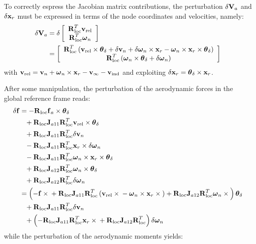 To correctly espress the Jacobian matrix contributions, the perturbation 
$\delta\T{V}_a$ and $\delta \T{x}_r$ must be expressed in terms of 
the node coordinates and velocities, namely:
\begin{align}
	\delta\T{V}_a &= \delta\sqbr{\matr{c}{
		\TT{R}^T_{\text{loc}}
			\T{v}_{\text{rel}}
		\\
		\TT{R}^T_{\text{loc}} \T{\omega}_n
		}}
	\nonumber \\
	&= \sqbr{\matr{c}{
	\TT{R}^T_{\text{loc}} \plbr{
		\T{v}_{\text{rel}} \times \T{\theta}_\delta
		+ \delta\T{v}_n
		+ \delta\T{\omega}_n\times\T{x}_r
		- \T{\omega}_n\times\T{x}_r\times\T{\theta}_{\delta}}
	\\
	\TT{R}^T_{\text{loc}}\plbr{
		\T{\omega}_n \times\T{\theta}_\delta
		+ \delta\T{\omega}_n
	}
	}}
\end{align}
with $\T{v}_{\text{rel}}=\T{v}_n + \T{\omega}_n\times\T{x}_r - \T{v}_{\infty} - \T{v}_{\text{ind}}$
and exploiting $\delta\T{x}_r = \T{\theta}_\delta\times\T{x}_r$.

After some manipulation, the perturbation of the aerodynamic forces  
in the global reference frame reads:
\begin{align}
	\delta\T{f} &= 
	-\TT{R}_{\text{loc}}\T{f}_a\times\T{\theta}_\delta
	\nonumber \\
	&\hphantom{= }+ \TT{R}_{\text{loc}}\T{J}_{a11}\TT{R}^T_{\text{loc}}\T{v}_{\text{rel}}\times\T{\theta}_\delta
	\nonumber \\
	&\hphantom{= }+ \TT{R}_{\text{loc}}\T{J}_{a11}\TT{R}^T_{\text{loc}}\delta\T{v}_n
	\nonumber \\
	&\hphantom{= }- \TT{R}_{\text{loc}}\T{J}_{a11}\TT{R}^T_{\text{loc}}
		\T{x}_r\times\delta\T{\omega}_n
	\nonumber \\
	&\hphantom{= }- \TT{R}_{\text{loc}}\T{J}_{a11}\TT{R}^T_{\text{loc}}
		\T{\omega}_n\times\T{x}_r\times\T{\theta}_\delta
	\nonumber \\
	&\hphantom{= }+ \TT{R}_{\text{loc}}\T{J}_{a12}\TT{R}^T_{\text{loc}}\T{\omega}_n
		\times\T{\theta}_\delta
	\nonumber \\
	&\hphantom{= }+ \TT{R}_{\text{loc}}\T{J}_{a12}\TT{R}^T_{\text{loc}}\delta\T{\omega}_n
	\nonumber \\
	&=
	\plbr{
		- \T{f}\times{}
		+ \TT{R}_{\text{loc}}\T{J}_{a11}\TT{R}^T_{\text{loc}}\plbr{
			\T{v}_{\text{rel}}\times{}
			- \T{\omega}_n\times\T{x}_r\times{}
		}
		+ \TT{R}_{\text{loc}}\T{J}_{a12}\TT{R}^T_{\text{loc}}\T{\omega}_n\times{}
	} \T{\theta}_\delta
	\nonumber \\
	&\hphantom{= }+ \TT{R}_{\text{loc}}\T{J}_{a11}\TT{R}^T_{\text{loc}}\delta\T{v}_n
	\nonumber \\
	&\hphantom{= }+ \plbr{
		- \TT{R}_{\text{loc}}\T{J}_{a11}\TT{R}^T_{\text{loc}} \T{x}_r\times{}
		+ \TT{R}_{\text{loc}}\T{J}_{a12}\TT{R}^T_{\text{loc}}
	} \delta\T{\omega}_n
	\label{eq:deltaF}
\end{align}
while the perturbation of the aerodynamic moments yields:


